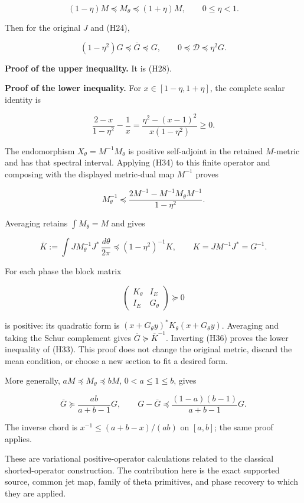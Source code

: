 \documentclass[
]{article}
\begin{document}
\[
 (1-\eta)M\preceq M_\theta\preceq(1+\eta)M,
 \qquad 0\leq\eta<1.
 \tag{H32}
\]

Then for the original \(J\) and (H24),

\[
 \boxed{(1-\eta^2)G\preceq\overline G\preceq G,
 \qquad 0\preceq\mathscr D\preceq\eta^2G.}
 \tag{H33}
\]

\textbf{Proof of the upper inequality.} It is (H28).

\textbf{Proof of the lower inequality.} For \(x\in[1-\eta,1+\eta]\), the
complete scalar identity is

\[
 \frac{2-x}{1-\eta^2}-\frac1x
 =\frac{\eta^2-(x-1)^2}{x(1-\eta^2)}\geq0.
 \tag{H34}
\]

The endomorphism \(X_\theta=M^{-1}M_\theta\) is positive self-adjoint in
the retained \(M\)-metric and has that spectral interval. Applying (H34)
to this finite operator and composing with the displayed metric-dual map
\(M^{-1}\) proves

\[
 M_\theta^{-1}\preceq
 \frac{2M^{-1}-M^{-1}M_\theta M^{-1}}{1-\eta^2}.
 \tag{H35}
\]

Averaging retains \(\int M_\theta=M\) and gives

\[
 \overline K:=\int JM_\theta^{-1}J^*\,\frac{d\theta}{2\pi}
 \preceq (1-\eta^2)^{-1}K,\qquad K=JM^{-1}J^*=G^{-1}.
 \tag{H36}
\]

For each phase the block matrix

\[
 \begin{pmatrix}K_\theta&I_E\\I_E&G_\theta\end{pmatrix}\succeq0
 \tag{H37}
\]

is positive: its quadratic form is
\((x+G_\theta y)^*K_\theta(x+G_\theta y)\). Averaging and taking the
Schur complement gives \(\overline G\succeq\overline K^{-1}\). Inverting
(H36) proves the lower inequality of (H33). This proof does not change
the original metric, discard the mean condition, or choose a new section
to fit a desired form.

More generally, \(aM\preceq M_\theta\preceq bM\), \(0<a\leq1\leq b\),
gives

\[
 \overline G\succeq\frac{ab}{a+b-1}G,
 \qquad
 G-\overline G\preceq
 \frac{(1-a)(b-1)}{a+b-1}G.
 \tag{H38}
\]

The inverse chord is \(x^{-1}\leq(a+b-x)/(ab)\) on \([a,b]\); the same
proof applies.

These are variational positive-operator calculations related to the
classical shorted-operator construction. The contribution here is the
exact supported source, common jet map, family of theta primitives, and
phase recovery to which they are applied.
\end{document}
